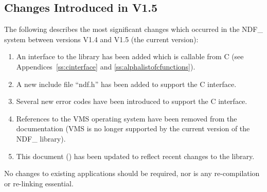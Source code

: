 \subsection{Changes Introduced in V1.5}

The following describes the most significant changes which occurred in
the NDF\_ system between versions V1.4 and V1.5 (the current version):

\begin{enumerate}
\item An interface to the library has been added which is callable
from C (see Appendices~\ref{ss:cinterface} and
\ref{ss:alphalistofcfunctions}).

\item A new include file ``ndf.h'' has been added to support the
C interface.

\item Several new error codes have been introduced to support the C
interface.

\item References to the VMS operating system have been removed from
the documentation (VMS is no longer supported by the current version
of the NDF\_ library).

\item This document () has been updated to
reflect recent changes to the library.
\end{enumerate}

No changes to existing applications should be required, nor is any
re-compilation or re-linking essential.



